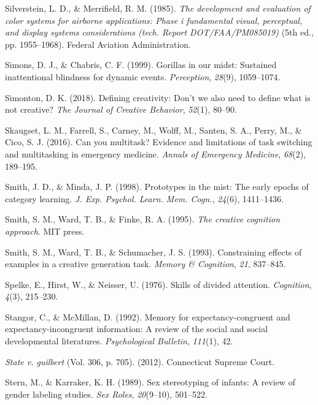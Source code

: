 \documentclass[
]{krantz}
\newlength{\cslhangindent}
\newenvironment{CSLReferences}[2] %
 {\begin{list}{}{%
  \setlength{\itemindent}{0pt}
  \setlength{\leftmargin}{0pt}
  \setlength{\parsep}{0pt}
  \ifodd #1
   \setlength{\leftmargin}{\cslhangindent}
   \setlength{\itemindent}{-1\cslhangindent}
  \fi
  \setlength{\itemsep}{#2\baselineskip}}}
 {\end{list}}
\begin{document}
\begin{CSLReferences}{1}{0}
Silverstein, L. D., \& Merrifield, R. M. (1985). \emph{The development and evaluation of color systems for airborne applications: Phase i fundamental visual, perceptual, and display systems considerations (tech. Report DOT/FAA/PM085019)} (5th ed., pp. 1955--1968). Federal Aviation Administration.

Simons, D. J., \& Chabris, C. F. (1999). Gorillas in our midst: Sustained inattentional blindness for dynamic events. \emph{Perception}, \emph{28}(9), 1059--1074.

Simonton, D. K. (2018). Defining creativity: Don't we also need to define what is not creative? \emph{The Journal of Creative Behavior}, \emph{52}(1), 80--90.

Skaugset, L. M., Farrell, S., Carney, M., Wolff, M., Santen, S. A., Perry, M., \& Cico, S. J. (2016). Can you multitask? Evidence and limitations of task switching and multitasking in emergency medicine. \emph{Annals of Emergency Medicine}, \emph{68}(2), 189--195.

Smith, J. D., \& Minda, J. P. (1998). Prototypes in the mist: The early epochs of category learning. \emph{J. Exp. Psychol. Learn. Mem. Cogn.}, \emph{24}(6), 1411--1436.

Smith, S. M., Ward, T. B., \& Finke, R. A. (1995). \emph{The creative cognition approach}. MIT press.

Smith, S. M., Ward, T. B., \& Schumacher, J. S. (1993). Constraining effects of examples in a creative generation task. \emph{Memory \& Cognition}, \emph{21}, 837--845.

Spelke, E., Hirst, W., \& Neisser, U. (1976). Skills of divided attention. \emph{Cognition}, \emph{4}(3), 215--230.

Stangor, C., \& McMillan, D. (1992). Memory for expectancy-congruent and expectancy-incongruent information: A review of the social and social developmental literatures. \emph{Psychological Bulletin}, \emph{111}(1), 42.

\emph{State v. guilbert} (Vol. 306, p. 705). (2012). Connecticut Supreme Court.

Stern, M., \& Karraker, K. H. (1989). Sex stereotyping of infants: A review of gender labeling studies. \emph{Sex Roles}, \emph{20}(9--10), 501--522.


\end{CSLReferences}
\end{document}
